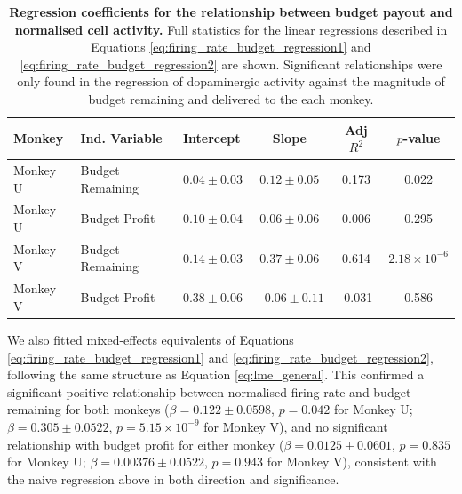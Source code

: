 \begin{table}[htbp]
\centering
\begin{tabular}{lllccc}
\hline
\textbf{Monkey} & \textbf{Ind. Variable} & \textbf{Intercept} & \textbf{Slope} & \textbf{Adj} $R^2$ & $p$\textbf{-value} \\
\hline
Monkey U & Budget Remaining & $0.04 \pm 0.03$ & $0.12 \pm 0.05$ & 0.173 & 0.022 \\
Monkey U & Budget Profit & $0.10 \pm 0.04$ & $0.06 \pm 0.06$ & 0.006 & 0.295 \\
\hline
Monkey V & Budget Remaining & $0.14 \pm 0.03$ & $0.37 \pm 0.06$ & 0.614 & $2.18 \times 10^{-6}$ \\
Monkey V & Budget Profit & $0.38 \pm 0.06$ & $-0.06 \pm 0.11$ & -0.031 & 0.586 \\
\hline
\end{tabular}
\caption[Regression coefficients for the relationship between budget payout and normalised cell activity.]{\textbf{Regression coefficients for the relationship between budget payout and normalised cell activity.} Full statistics for the linear regressions described in Equations \ref{eq:firing_rate_budget_regression1} and \ref{eq:firing_rate_budget_regression2} are shown. Significant relationships were only found in the regression of dopaminergic activity against the magnitude of budget remaining and delivered to the each monkey.}
\label{tab:water_delivery_regression_results}
\end{table}

We also fitted mixed-effects equivalents of Equations \ref{eq:firing_rate_budget_regression1} and \ref{eq:firing_rate_budget_regression2}, following the same structure as Equation \ref{eq:lme_general}. This confirmed a significant positive relationship between normalised firing rate and budget remaining for both monkeys ($\beta = 0.122 \pm 0.0598$, $p = 0.042$ for Monkey U; $\beta = 0.305 \pm 0.0522$, $p = 5.15 \times 10^{-9}$ for Monkey V), and no significant relationship with budget profit for either monkey ($\beta = 0.0125 \pm 0.0601$, $p = 0.835$ for Monkey U; $\beta = 0.00376 \pm 0.0522$, $p = 0.943$ for Monkey V), consistent with the naive regression above in both direction and significance.

